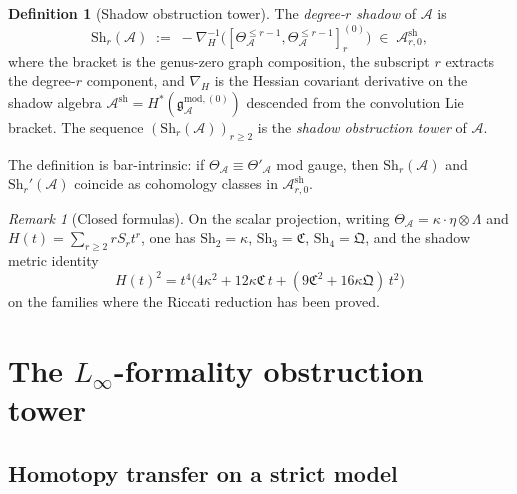 \documentclass[11pt,reqno]{amsart}
\theoremstyle{definition}
\newtheorem{definition}[theorem]{Definition}
\theoremstyle{remark}
\newtheorem{remark}[theorem]{Remark}
\providecommand{\cA}{\mathcal{A}}
\providecommand{\gmodzero}{\mathfrak{g}^{\mathrm{mod},(0)}_{\cA}}
\providecommand{\Sh}{\mathrm{Sh}}
\providecommand{\Ash}{\cA^{\mathrm{sh}}}
\providecommand{\Linf}{L_\infty}
\numberwithin{equation}{section}
\begin{document}
\begin{definition}[Shadow obstruction tower]
\label{def:n6-shadow-obstruction-tower}
The \emph{degree-$r$ shadow} of $\cA$ is
\begin{equation}\label{eq:shadow-definition}
\Sh_r(\cA)\;:=\;-\nabla_H^{-1}\bigl(
[\Theta^{\le r-1}_{\cA},
\Theta^{\le r-1}_{\cA}]_r^{(0)}\bigr)
\;\in\;\Ash_{r,0},
\end{equation}
where the bracket is the genus-zero graph composition, the
subscript $r$ extracts the degree-$r$ component, and $\nabla_H$ is
the Hessian covariant derivative on the shadow algebra
$\Ash=H^*(\gmodzero)$ descended from the convolution Lie bracket.
The sequence $(\Sh_r(\cA))_{r\ge 2}$ is the \emph{shadow
obstruction tower} of $\cA$.
\end{definition}

The definition is bar-intrinsic: if
$\Theta_{\cA}\equiv\Theta'_{\cA}$ mod gauge, then $\Sh_r(\cA)$
and $\Sh_r'(\cA)$ coincide as cohomology classes in $\Ash_{r,0}$.

\begin{remark}[Closed formulas]
On the scalar projection, writing
$\Theta_{\cA}=\kappa\cdot\eta\otimes\Lambda$ and
$H(t)=\sum_{r\ge2}rS_r t^r$, one has
$\Sh_2=\kappa$, $\Sh_3=\mathfrak{C}$, $\Sh_4=\mathfrak{Q}$, and
the shadow metric identity
\[
H(t)^2=t^4\bigl(4\kappa^2+12\kappa\mathfrak{C}\,t
+(9\mathfrak{C}^2+16\kappa\mathfrak{Q})\,t^2\bigr)
\]
on the families where the Riccati reduction has been proved.
\end{remark}

\section{The $\Linf$-formality obstruction tower}
\label{sec:formality-tower}

\subsection{Homotopy transfer on a strict model}
\end{document}
